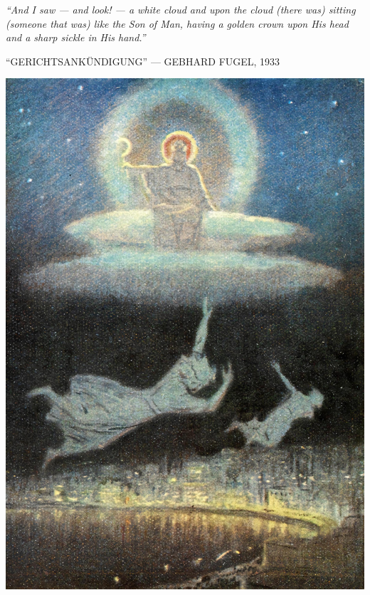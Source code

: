 \clearpage
\thispagestyle{empty}
\null\vfill
\settowidth{}
\begin{center}
\parbox{\longest}{%
  \raggedright{\huge\itshape%
    ``And I saw — and look! — a white cloud and upon the cloud (there was) sitting (someone that was) like the Son of Man, having a golden crown upon His head and a sharp sickle in His hand.'' \par\bigskip
  }
  \raggedleft\Large\MakeUppercase{``Gerichtsankündigung'' — Gebhard Fugel, 1933}\par%
}
\vfill\vfill
\clearpage\newpage
\end{center}
\newpage
\thispagestyle{empty}
\begin{center}
	\includegraphics[width=1\textwidth]{images/illustrations/fugelgericht}
\end{center}